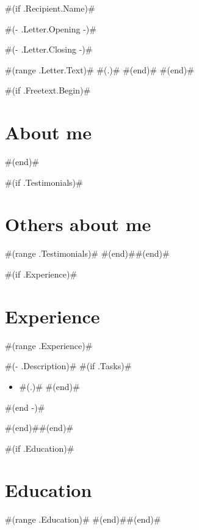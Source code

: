\documentclass[10pt,a4paper,sans]{moderncv}
\begin{document}
#(if .Recipient.Name)#
  \date{ #(- .Letter.Date -)# }
  \opening{ #(- .Letter.Opening -)# }
  \closing{ #(- .Letter.Closing -)# }
  \makelettertitle
  #(range .Letter.Text)#
    #(.)#
  #(end)#
  \makeletterclosing
  \pagebreak
#(end)#


\makecvtitle

#(if .Freetext.Begin)#\section{About me}
#(end)#

#(if .Testimonials)#\section{Others about me}
#(range .Testimonials)#
#(end)##(end)#

#(if .Experience)#\section{Experience}
#(range .Experience)#
{ #(- .Description)# 
  #(if .Tasks)#\begin{itemize}
    #(range .Tasks)# \item #(.)#
    #(end)#\end{itemize}
  #(end -)# }
#(end)##(end)#

#(if .Education)#\section{Education}
#(range .Education)#
#(end)##(end)#
\end{document}
